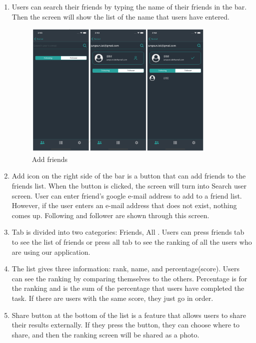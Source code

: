 \documentclass[conference]{IEEEtran}
\begin{document}
\begin{enumerate}

    \item Users can search their friends by typing the name of their friends in the bar. Then the screen will show the list of the name that users have entered.
    
    \begin{figure}[htp] \centering \includegraphics[width=260pt]{Add Friends최종.jpg} \caption{Add friends} \label{fig:AddFriends} \end{figure} 
    
    \item Add icon on the right side of the bar is a button that can add friends to the friends list. When the button is clicked, the screen will turn into Search user screen. User can enter friend's google e-mail address to add to a friend list. However, if the user enters an e-mail address that does not exist, nothing comes up. Following and follower are shown through this screen.
    \item Tab is divided into two categories: Friends, All  . Users can press friends tab to see the list of friends or press all tab to see the ranking of all the users who are using our application.
    \item The list gives three information: rank, name, and percentage(score). Users can see the ranking by comparing themselves to the others. Percentage is for the ranking and is the sum of the percentage that users have completed the task. If there are users with the same score, they just go in order.
    \item Share button at the bottom of the list is a feature that allows users to share their results externally. If they press the button, they can choose where to share, and then the ranking screen will be shared as a photo.
\end{enumerate}
\end{document}
